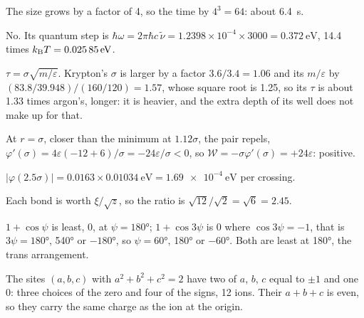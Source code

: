 \label{sec:pe-answers}

The size grows by a factor of 4, so the time by
$4^3 = 64$: about \SI{6.4}{\second}.

No. Its quantum step is $\hbar\omega =
2\pi\hbar c\,\tilde\nu = 1.2398\times10^{-4}\times3000 = \SI{0.372}{\electronvolt}$,
14.4 times $k_{\mathrm{B}} T = \SI{0.02585}{\electronvolt}$.

$\tau = \sigma\sqrt{m/\varepsilon}$. Krypton's
$\sigma$ is larger by a factor $3.6/3.4 = 1.06$ and its $m/\varepsilon$ by
$(83.8/39.948)/(160/120) = 1.57$, whose square root is 1.25, so its
$\tau$ is about 1.33 times argon's, longer: it is heavier, and the extra
depth of its well does not make up for that.

At $r = \sigma$, closer than the minimum at
$1.12\sigma$, the pair repels, $\varphi'(\sigma) = 4\varepsilon(-12 + 6)/
\sigma = -24\varepsilon/\sigma < 0$, so $\mathcal{W} = -\sigma\varphi'(\sigma) =
+24\varepsilon$: positive.

$\lvert\varphi(2.5\sigma)\rvert = 0.0163\times
\SI{0.01034}{\electronvolt} = \SI{1.69e-4}{\electronvolt}$ per crossing.

Each bond is worth $\xi/\sqrt{z}$, so the ratio
is $\sqrt{12}/\sqrt2 = \sqrt6 = 2.45$.

$1 + \cos\psi$ is least, 0, at $\psi = \ang{180}$;
$1 + \cos3\psi$ is 0 where $\cos3\psi = -1$, that is $3\psi = \ang{180}$,
\ang{540} or $-\ang{180}$, so $\psi = \ang{60}$, \ang{180} or $-\ang{60}$.
Both are least at \ang{180}, the trans arrangement.

The sites $(a, b, c)$ with $a^2 + b^2 + c^2 = 2$
have two of $a$, $b$, $c$ equal to $\pm1$ and one 0: three choices of the
zero and four of the signs, 12 ions. Their $a + b + c$ is even, so they
carry the same charge as the ion at the origin.
